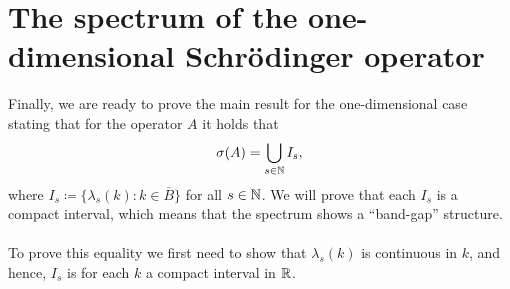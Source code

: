 \chapter{The spectrum of the one-dimensional Schrödinger operator} \label{chap:6}
Finally, we are ready to prove the main result for the one-dimensional case stating that for the operator $A$ it holds that
	\begin{equation}
		\sigma(A) = \bigcup_{s \in \mathbb{N}} I_{s}, \label{MainResult}
	\end{equation}
where $I_{s} \coloneqq \{ \lambda_{s}(k) : k \in \overline{B} \}$ for all $s \in \mathbb{N}$. We will prove that each $I_{s}$ is a compact interval, which means that the spectrum shows a \enquote{band-gap} structure. 
~\\

To prove this equality we first need to show that $\lambda_{s}(k)$ is continuous in $k$, and hence, $I_{s}$ is for each $k$ a compact interval in $\mathbb{R}$.

